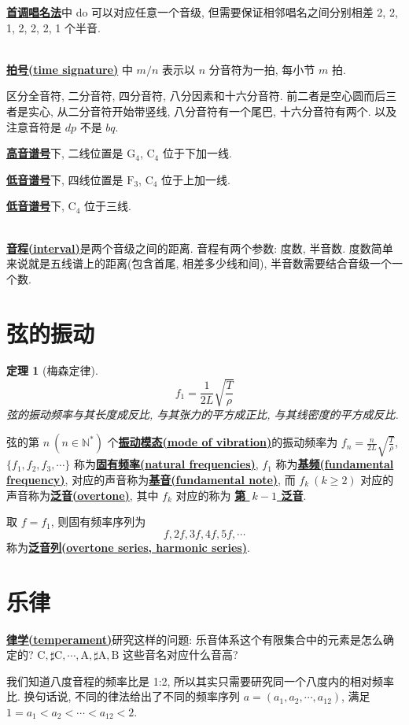 \documentclass[8pt]{article}
\theoremstyle{compact}
\newtheorem{theorem}{定理}[section]
\def\obj#1{\textbf{\uline{#1}}}
\def\ge{\geqslant}
\def\A{\textrm{A}}
\def\B{\textrm{B}}
\def\C{\textrm{C}}
\def\F{\textrm{F}}
\def\G{\textrm{G}}
\begin{document}
\obj{首调唱名法}中 do 可以对应任意一个音级, 但需要保证相邻唱名之间分别相差 2, 2, 1, 2, 2, 2, 1 个半音.

~\\

\obj{拍号(time signature)} 中 $m / n$ 表示以 $n$ 分音符为一拍, 每小节 $m$ 拍.

区分全音符, 二分音符, 四分音符, 八分因素和十六分音符. 前二者是空心圆而后三者是实心, 从二分音符开始带竖线, 八分音符有一个尾巴, 十六分音符有两个. 以及注意音符是 $dp$ 不是 $bq$.

\obj{高音谱号}下, 二线位置是 $\G_4$, $\C_4$ 位于下加一线.

\obj{低音谱号}下, 四线位置是 $\F_3$, $\C_4$ 位于上加一线.

\obj{低音谱号}下, $\C_4$ 位于三线.

~\\

\obj{音程(interval)}是两个音级之间的距离. 音程有两个参数: 度数, 半音数. 度数简单来说就是五线谱上的距离(包含首尾, 相差多少线和间), 半音数需要结合音级一个一个数.


\section{弦的振动}
\begin{theorem}[梅森定律]
	$$f_1 = \frac{1}{2L}\sqrt{\frac{T}{\rho}}$$ 弦的振动频率与其长度成反比, 与其张力的平方成正比, 与其线密度的平方成反比.
\end{theorem}
弦的第 $n \ (n \in \mathbb N^*)$ 个\obj{振动模态(mode of vibration)}的振动频率为 $f_n = \frac{n}{2L}\sqrt{\frac{T}{\rho}}$, $\{f_1, f_2, f_3, \cdots \}$ 称为\obj{固有频率(natural frequencies)}, $f_1$ 称为\obj{基频(fundamental frequency)}, 对应的声音称为\obj{基音(fundamental note)}, 而 $f_k \ (k \ge 2)$ 对应的声音称为\obj{泛音(overtone)}, 其中 $f_k$ 对应的称为 \obj{第 $\ k-1$ 泛音}.

取 $f = f_1$, 则固有频率序列为 $$f, 2f, 3f, 4f, 5f, \cdots$$ 称为\obj{泛音列(overtone series, harmonic series)}.


\section{乐律}

\obj{律学(temperament)}研究这样的问题: 乐音体系这个有限集合中的元素是怎么确定的? $\C, \sharp\C, \cdots, \A, \sharp\A, \B$ 这些音名对应什么音高?

我们知道八度音程的频率比是 1:2, 所以其实只需要研究同一个八度内的相对频率比. 换句话说, 不同的律法给出了不同的频率序列 $a = (a_1, a_2, \cdots, a_{12})$, 满足 $1 = a_1 < a_2 < \cdots < a_{12} < 2$.
\end{document}
